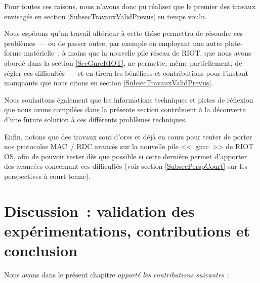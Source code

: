 Pour toutes ces raisons, nous n'avons donc pu réaliser que le premier des
travaux envisagés en section \vref{SubsecTravauxValidPrevus} en temps voulu.

Nous espérons qu'un travail ultérieur à cette thèse permettra de résoudre
ces problèmes~--- ou de passer outre, par exemple en employant une autre
plate-forme matérielle~; à moins que la nouvelle pile réseau de RIOT, que
nous avons abordé dans la section \ref{SecGnrcRIOT}, ne permette, même
partiellement, de régler ces difficultés~--- et en tirera les bénéfices
et contributions pour l'instant manquants que nous citons en section
\vref{SubsecTravauxValidPrevus}.

Nous souhaitons également que les informations techniques et pistes de
réflexion que nous avons compilées dans la présente section contribuent
à la découverte d'une future solution à ces différents problèmes techniques.

\medskip

Enfin, notons que des travaux sont d'ores et déjà en cours pour tenter de
porter nos protocoles MAC~/ RDC avancés sur la nouvelle pile <<~gnrc~>> de
RIOT OS, afin de pouvoir tester dès que possible si cette dernière permet 
d'apporter des avancées concernant ces difficultés (voir section
\vref{SubsecPerspCourt} sur les perspectives à court terme).


\section[Discussion~: validation, contributions et conclusion]
        {Discussion~: validation des expérimentations, contributions
         et conclusion}
\label{SecConcluChValidation}

Nous avons dans le présent chapitre \emph{apporté les contributions
suivantes}~:

